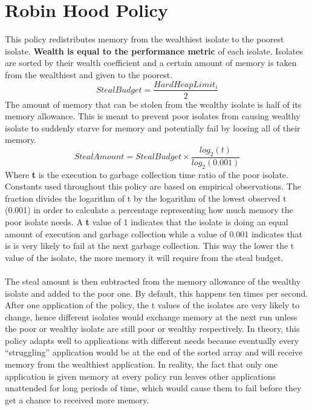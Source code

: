 \documentclass{l4proj}
\begin{document}
\section{Robin Hood Policy}
\hspace*{1em} This policy redistributes memory from the wealthiest isolate to the poorest isolate. \textbf{Wealth is equal to the performance metric} of each isolate. Isolates are sorted by their wealth coefficient and a certain amount of memory is taken from the wealthiest and given to the poorest.
\begin{equation}
\textit{StealBudget} = \dfrac{HardHeapLimit_i}{2}
\end{equation}
\hspace*{1em} The amount of memory that can be stolen from the wealthy isolate is half of its memory allowance. This is meant to prevent poor isolates from causing wealthy isolate to suddenly starve for memory and potentially fail by loosing all of their memory.
\begin{equation}
\textit{StealAmount} = StealBudget \times \dfrac{log_2\left(t\right)}{log_2\left(0.001\right)}
\end{equation}
\hspace*{1em} Where \textbf{t} is the execution to garbage collection time ratio of the poor isolate. Constants used throughout this policy are based on empirical observations. The fraction divides the logarithm of t by the logarithm of the lowest observed t (0.001) in order to calculate a percentage representing how much memory the poor isolate needs. A \textbf{t} value of 1 indicates that the isolate is doing an equal amount of execution and garbage collection while a value of 0.001 indicates that is is very likely to fail at the next garbage collection. This way the lower the t value of the isolate, the more memory it will require from the steal budget.
\\\\
\hspace*{1em} The steal amount is then subtracted from the memory allowance of the wealthy isolate and added to the poor one. By default, this happens ten times per second. After one application of the policy, the t values of the isolates are very likely to change, hence different isolates would exchange memory at the next run unless the poor or wealthy isolate are still poor or wealthy respectively. In theory, this policy adapts well to applications with different needs because eventually every ``struggling'' application would be at the end of the sorted array and will receive memory from the wealthiest application. In reality, the fact that only one application is given memory at every policy run leaves other applications unattended for long periods of time, which would cause them to fail before they get a chance to received more memory.
\end{document}
